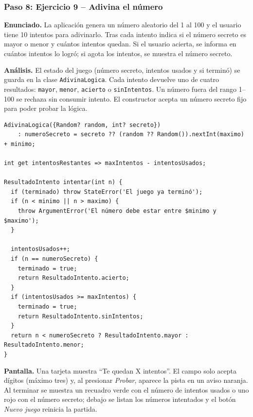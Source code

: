 \documentclass[12pt,a4paper]{article}
\begin{document}
\subsubsection*{Paso 8: Ejercicio 9 -- Adivina el número}

\textbf{Enunciado.} La aplicación genera un número aleatorio del 1 al 100 y el usuario tiene 10 intentos para adivinarlo. Tras cada intento indica si el número secreto es mayor o menor y cuántos intentos quedan. Si el usuario acierta, se informa en cuántos intentos lo logró; si agota los intentos, se muestra el número secreto.

\textbf{Análisis.} El estado del juego (número secreto, intentos usados y si terminó) se guarda en la clase \texttt{AdivinaLogica}. Cada intento devuelve uno de cuatro resultados: \texttt{mayor}, \texttt{menor}, \texttt{acierto} o \texttt{sinIntentos}. Un número fuera del rango 1--100 se rechaza sin consumir intento. El constructor acepta un número secreto fijo para poder probar la lógica.

\begin{lstlisting}[style=dart, caption={Procesamiento de un intento en el ejercicio 9 (\texttt{adivina\_logica.dart}).}, label={lst:ej9}]
AdivinaLogica({Random? random, int? secreto})
    : numeroSecreto = secreto ?? (random ?? Random()).nextInt(maximo) + minimo;

int get intentosRestantes => maxIntentos - intentosUsados;

ResultadoIntento intentar(int n) {
  if (terminado) throw StateError('El juego ya terminó');
  if (n < minimo || n > maximo) {
    throw ArgumentError('El número debe estar entre $minimo y $maximo');
  }

  intentosUsados++;
  if (n == numeroSecreto) {
    terminado = true;
    return ResultadoIntento.acierto;
  }
  if (intentosUsados >= maxIntentos) {
    terminado = true;
    return ResultadoIntento.sinIntentos;
  }
  return n < numeroSecreto ? ResultadoIntento.mayor : ResultadoIntento.menor;
}
\end{lstlisting}

\textbf{Pantalla.} Una tarjeta muestra ``Te quedan X intentos''. El campo solo acepta dígitos (máximo tres) y, al presionar \textit{Probar}, aparece la pista en un aviso naranja. Al terminar se muestra un recuadro verde con el número de intentos usados o uno rojo con el número secreto; debajo se listan los números intentados y el botón \textit{Nuevo juego} reinicia la partida.
\end{document}
